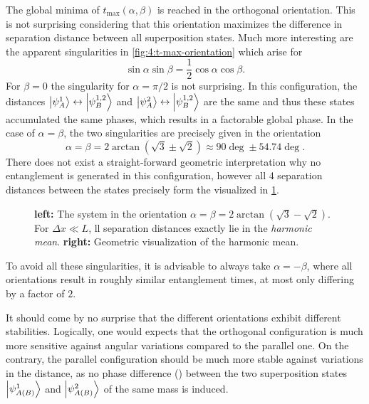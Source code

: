 The global minima of $t_\mathrm{max}(\alpha,\beta)$ is reached in the orthogonal orientation. This is not surprising considering that this orientation maximizes the difference in separation distance between all superposition states.
Much more interesting are the apparent singularities in \cref{fig:4:t-max-orientation} which arise for 
\begin{equation}
  \sin\alpha\sin\beta=\frac{1}{2}\cos\alpha\cos\beta .
\end{equation}
For $\beta=0$ the singularity for $\alpha=\pi/2$ is not surprising. In this configuration, the distances $\ket{\psi^1_A}\leftrightarrow\ket{\psi^{1,2}_B}$ and $\ket{\psi^2_A}\leftrightarrow\ket{\psi^{1,2}_B}$ are the same and thus these states accumulated the same phases, which results in a factorable global phase.
In the case of $\alpha=\beta$, the two singularities are precisely given in the orientation
\begin{equation}
  \alpha=\beta=2 \arctan(\sqrt{3}\pm\sqrt{2})\approx 90\deg \pm 54.74\deg .
\end{equation}
There does not exist a straight-forward geometric interpretation why no entanglement is generated in this configuration, however all 4 separation distances between the states precisely form the  visualized in \cref{fig:4:harmonic-mean}.
\begin{figure}[!htbp]
  \centering
  \def\svgwidth{\textwidth}
  
  \caption{\textbf{left:} The system in the orientation $\alpha=\beta=2\arctan(\sqrt{3}-\sqrt{2})$. For $\Delta x \ll L$, ll separation distances exactly lie in the \textit{harmonic mean}. \textbf{right:} Geometric visualization of the harmonic mean.}
  \label{fig:4:harmonic-mean}
\end{figure}
To avoid all these singularities, it is advisable to always take $\alpha=-\beta$, where all orientations result in roughly similar entanglement times, at most only differing by a factor of $2$.

It should come by no surprise that the different orientations exhibit different stabilities. Logically, one would expects that the orthogonal configuration is much more sensitive against angular variations compared to the parallel one.
On the contrary, the parallel configuration should be much more stable against variations in the distance, as no phase difference () between the two superposition states $\ket{\psi^1_{A(B)}}$ and $\ket{\psi^2_{A(B)}}$ of the same mass is induced.

